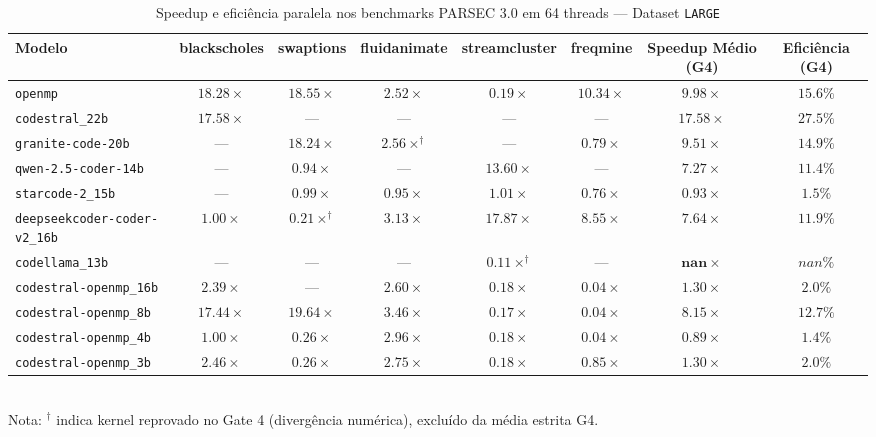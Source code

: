 
\begin{table}[htbp]
\centering
\caption{Speedup e eficiência paralela nos benchmarks PARSEC 3.0 em 64 threads — Dataset \texttt{LARGE}}
\label{tab:parsec_scale_large}
\small
\begin{tabular}{lccccc cc}
\toprule
\textbf{Modelo} & \textbf{blackscholes} & \textbf{swaptions} & \textbf{fluidanimate} & \textbf{streamcluster} & \textbf{freqmine} & \textbf{Speedup Médio (G4)} & \textbf{Eficiência (G4)} \\
\midrule
\texttt{openmp} & $18.28\times$ & $18.55\times$ & $2.52\times$ & $0.19\times$ & $10.34\times$ & $\mathbf{9.98\times}$ & $15.6\%$ \\
\texttt{codestral\_22b} & $17.58\times$ & --- & --- & --- & --- & $\mathbf{17.58\times}$ & $27.5\%$ \\
\texttt{granite-code-20b} & --- & $18.24\times$ & $2.56\times^\dagger$ & --- & $0.79\times$ & $\mathbf{9.51\times}$ & $14.9\%$ \\
\texttt{qwen-2.5-coder-14b} & --- & $0.94\times$ & --- & $13.60\times$ & --- & $\mathbf{7.27\times}$ & $11.4\%$ \\
\texttt{starcode-2\_15b} & --- & $0.99\times$ & $0.95\times$ & $1.01\times$ & $0.76\times$ & $\mathbf{0.93\times}$ & $1.5\%$ \\
\texttt{deepseekcoder-coder-v2\_16b} & $1.00\times$ & $0.21\times^\dagger$ & $3.13\times$ & $17.87\times$ & $8.55\times$ & $\mathbf{7.64\times}$ & $11.9\%$ \\
\texttt{codellama\_13b} & --- & --- & --- & $0.11\times^\dagger$ & --- & $\mathbf{nan\times}$ & $nan\%$ \\
\texttt{codestral-openmp\_16b} & $2.39\times$ & --- & $2.60\times$ & $0.18\times$ & $0.04\times$ & $\mathbf{1.30\times}$ & $2.0\%$ \\
\texttt{codestral-openmp\_8b} & $17.44\times$ & $19.64\times$ & $3.46\times$ & $0.17\times$ & $0.04\times$ & $\mathbf{8.15\times}$ & $12.7\%$ \\
\texttt{codestral-openmp\_4b} & $1.00\times$ & $0.26\times$ & $2.96\times$ & $0.18\times$ & $0.04\times$ & $\mathbf{0.89\times}$ & $1.4\%$ \\
\texttt{codestral-openmp\_3b} & $2.46\times$ & $0.26\times$ & $2.75\times$ & $0.18\times$ & $0.85\times$ & $\mathbf{1.30\times}$ & $2.0\%$ \\
\bottomrule
\end{tabular}
\\[4pt]
\footnotesize{Nota: $^\dagger$ indica kernel reprovado no Gate 4 (divergência numérica), excluído da média estrita G4.}
\end{table}

